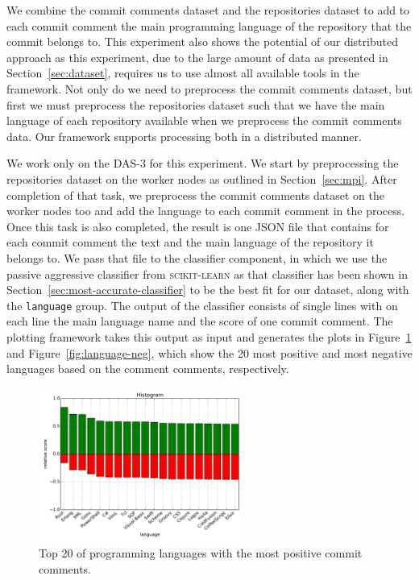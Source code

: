 \documentclass{article}
\begin{document}
We combine the commit comments dataset and the repositories dataset to add to
each commit comment the main programming language of the repository that the
commit belongs to. This experiment also shows the potential of our distributed
approach as this experiment, due to the large amount of data as presented in
Section~\ref{sec:dataset}, requires us to use almost all available tools in
the framework. Not only do we need to preprocess the commit comments dataset,
but first we must preprocess the repositories dataset such that we have the
main language of each repository available when we preprocess the commit
comments data. Our framework supports processing both in a distributed
manner.

We work only on the DAS-3 for this experiment. We start by preprocessing the
repositories dataset on the worker nodes as outlined in Section~\ref{sec:mpi}.
After completion of that task, we preprocess the commit comments dataset on
the worker nodes too and add the language to each commit comment in the
process. Once this task is also completed, the result is one JSON file that
contains for each commit comment the text and the main language of the
repository it belongs to. We pass that file to the classifier component, in
which we use the passive aggressive classifier from \textsc{scikit-learn} as
that classifier has been shown in Section~\ref{sec:most-accurate-classifier}
to be the best fit for our dataset, along with the {\tt language} group. The
output of the classifier consists of single lines with on each line the main
language name and the score of one commit comment. The plotting framework
takes this output as input and generates the plots in
Figure~\ref{fig:language-pos} and Figure~\ref{fig:language-neg}, which show
the 20 most positive and most negative languages based on the comment
comments, respectively.

\begin{figure}[h!]
  \centering
  \includegraphics[width=0.6\textwidth]{Images/Positive_languages_passive_aggressive.pdf}
  \caption{Top 20 of programming languages with the most positive commit comments.}\label{fig:language-pos}
\end{figure}
\end{document}
